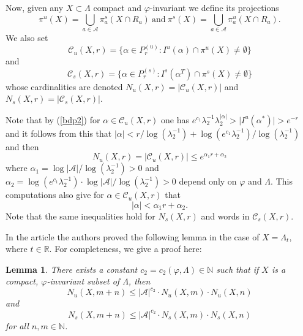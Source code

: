 \documentclass[12pt]{amsart}
\providecommand{\abs}[1]{\lvert#1\rvert}
\theoremstyle{plain} %
\newtheorem{lemma}[theorem]{Lemma}
\theoremstyle{definition} %
\numberwithin{equation}{section}
\begin{document}
Now, given any $X\subset \Lambda$ compact and $\varphi$-invariant we define its projections 
$$\pi^u(X)=\bigcup_{a\in \mathcal{A}} \pi^s_a(X\cap R_a) \ \mbox{and} \ \pi^s(X)=\bigcup_{a\in \mathcal{A}}\pi^u_a(X\cap R_a).$$
We also set
$$\mathcal{C}_u(X,r)=\{\alpha\in P^{(u)}_r:  I^{u}(\alpha)\cap \pi^u(X)\neq \emptyset\}$$
and
$$ \mathcal{C}_s(X,r)=\{\alpha\in P^{(s)}_r:  I^{s}(\alpha^T)\cap \pi^s(X)\neq \emptyset\}$$
whose cardinalities are denoted $N_u(X,r)=|\mathcal{C}_u(X,r)|$ and $N_s(X,r)=|\mathcal{C}_s(X,r)|$. 

Note that by (\ref{bdp2}) for $\alpha \in \mathcal{C}_u(X,r)$ one has $e^{c_1}\lambda_2^{-1}\lambda_2^{\abs{\alpha}}>\abs{I^u(\alpha^{\ast})} > e^{-r}$
and it follows from this that $\abs{\alpha}<r/\log(\lambda_2^{-1})+\log (e^{c_1}\lambda_2^{-1})/\log (\lambda_2^{-1})$ and then 
\begin{equation} \label{expN}
  N_u(X,r)=\abs{\mathcal{C}_u(X,r)} \leq e^{\alpha_1r+\alpha_2}
\end{equation}
where $\alpha_1=\log\abs{\mathcal{A}}/\log(\lambda_2^{-1}) >0$ and $\alpha_2=\log (e^{c_1}\lambda_2^{-1})\cdot \log\abs{\mathcal{A}} /\log (\lambda_2^{-1})>0$ depend only on $\varphi$ and $\Lambda$. This computations also give for $\alpha \in \mathcal{C}_u(X,r)$ that 
\begin{equation}\label{words}
    \abs{\alpha}<\alpha_1r+\alpha_2.\end{equation}
Note that the same inequalities hold for $N_s(X,r)$ and words in $\mathcal{C}_s(X,r)$.

In the article \cite{CMM16} the authors proved the following lemma in the case of $X=\Lambda_{t}$, where $t\in \mathbb{R}$. For completeness, we give a proof here:

\begin{lemma}\label{c_2}
There exists a constant $c_2= c_2(\varphi, \Lambda)\in \mathbb{N}$ such that
if $X$ is a compact, $\varphi$-invariant subset of $\Lambda$, then
	$$N_u(X,m+n)\le |\mathcal{A}|^{c_2}\cdot N_u(X,m)\cdot N_u(X,n)$$
and
	$$N_s(X,m+n)\le |\mathcal{A}|^{c_2}\cdot N_s(X,m)\cdot N_s(X,n)$$
for all $n, m\in\mathbb{N}$.
\end{lemma}
\end{document}
